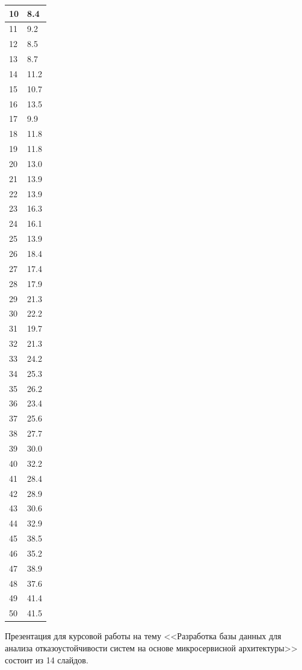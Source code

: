 \begin{center}
\begin{tabularx}{\textwidth}{|X|X|}
        10 & 8.4 \\ \hline
        11 & 9.2 \\ \hline
        12 & 8.5 \\ \hline
        13 & 8.7 \\ \hline
        14 & 11.2 \\ \hline
        15 & 10.7 \\ \hline
        16 & 13.5 \\ \hline
        17 & 9.9 \\ \hline
        18 & 11.8 \\ \hline
        19 & 11.8 \\ \hline
        20 & 13.0 \\ \hline
        21 & 13.9 \\ \hline
        22 & 13.9 \\ \hline
        23 & 16.3 \\ \hline
        24 & 16.1 \\ \hline
        25 & 13.9 \\ \hline
        26 & 18.4 \\ \hline
        27 & 17.4 \\ \hline
        28 & 17.9 \\ \hline
        29 & 21.3 \\ \hline
        30 & 22.2 \\ \hline
        31 & 19.7 \\ \hline
        32 & 21.3 \\ \hline
        33 & 24.2 \\ \hline
        34 & 25.3 \\ \hline
        35 & 26.2 \\ \hline
        36 & 23.4 \\ \hline
        37 & 25.6 \\ \hline
        38 & 27.7 \\ \hline
        39 & 30.0 \\ \hline
        40 & 32.2 \\ \hline
        41 & 28.4 \\ \hline
        42 & 28.9 \\ \hline
        43 & 30.6 \\ \hline
        44 & 32.9 \\ \hline
        45 & 38.5 \\ \hline
        46 & 35.2 \\ \hline
        47 & 38.9 \\ \hline
        48 & 37.6 \\ \hline
        49 & 41.4 \\ \hline
        50 & 41.5 \\ \hline

    \end{tabularx}
\end{center}

\appsection
Презентация для курсовой работы на тему <<Разработка базы данных для 
анализа отказоустойчивости систем на основе микросервисной архитектуры>>
состоит из 14 слайдов.